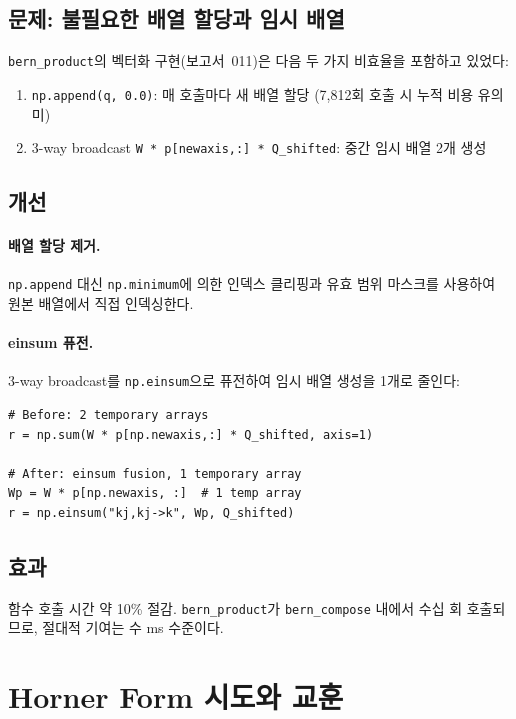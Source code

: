 \documentclass[11pt]{article}
\begin{document}
\subsection{문제: 불필요한 배열 할당과 임시 배열}

\texttt{bern\_product}의 벡터화 구현(보고서~011\cite{report011})은
다음 두 가지 비효율을 포함하고 있었다:

\begin{enumerate}
  \item \texttt{np.append(q, 0.0)}: 매 호출마다 새 배열 할당
        (7,812회 호출 시 누적 비용 유의미)
  \item 3-way broadcast
        \texttt{W * p[newaxis,:] * Q\_shifted}:
        중간 임시 배열 2개 생성
\end{enumerate}

\subsection{개선}

\paragraph{배열 할당 제거.}
\texttt{np.append} 대신 \texttt{np.minimum}에 의한 인덱스 클리핑과
유효 범위 마스크를 사용하여 원본 배열에서 직접 인덱싱한다.

\paragraph{einsum 퓨전.}
3-way broadcast를 \texttt{np.einsum}으로 퓨전하여
임시 배열 생성을 1개로 줄인다:
\begin{lstlisting}[style=pythonstyle]
# Before: 2 temporary arrays
r = np.sum(W * p[np.newaxis,:] * Q_shifted, axis=1)

# After: einsum fusion, 1 temporary array
Wp = W * p[np.newaxis, :]  # 1 temp array
r = np.einsum("kj,kj->k", Wp, Q_shifted)
\end{lstlisting}

\subsection{효과}

함수 호출 시간 약 10\% 절감.
\texttt{bern\_product}가 \texttt{bern\_compose} 내에서
수십 회 호출되므로, 절대적 기여는 수 ms 수준이다.


\section{Horner Form 시도와 교훈}
\label{sec:horner}
\end{document}
